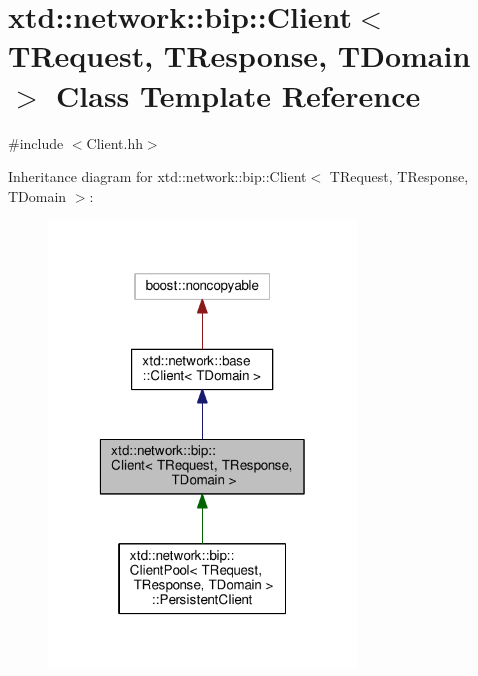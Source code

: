 \hypertarget{classxtd_1_1network_1_1bip_1_1Client}{\section{xtd\-:\-:network\-:\-:bip\-:\-:Client$<$ T\-Request, T\-Response, T\-Domain $>$ Class Template Reference}
\label{classxtd_1_1network_1_1bip_1_1Client}
}


{\ttfamily \#include $<$Client.\-hh$>$}



Inheritance diagram for xtd\-:\-:network\-:\-:bip\-:\-:Client$<$ T\-Request, T\-Response, T\-Domain $>$\-:
\nopagebreak
\begin{figure}[H]
\begin{center}
\leavevmode
\includegraphics[width=232pt]{classxtd_1_1network_1_1bip_1_1Client__inherit__graph}
\end{center}
\end{figure}


